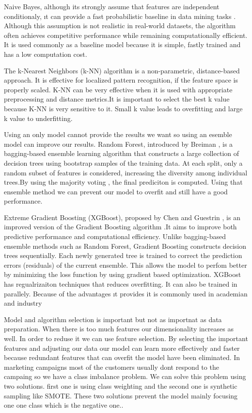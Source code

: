 \documentclass[conference]{IEEEtran}
\begin{document}
Naive Bayes, although its strongly assume that features are independent conditionaly, ıt can provide a fast probabilistic baseline in data mining tasks \cite{domingos1997}.
Although this assumption is not realistic in real-world datasets, the algorithm often achieves competitive performance while remaining computationally efficient.
It is used commonly as a baseline model because it is simple, fastly trained and has a low computation cost.

The k-Nearest Neighbors (k-NN) algorithm \cite{cover1967} is a non-parametric, distance-based approach.
It is effective for localized pattern recognition, if the feature space is properly scaled.
K-NN can be very effective when it is used with appropriate preprocessing and distance metrics.It is important to select the best k value because K-NN is very sensitive to it. Small k value leads to overfitting and large k value to underfitting.

Using an only model cannot provide the results we want so using an esemble model can improve our results.
Random Forest, introduced by Breiman \cite{breiman2001}, is a bagging-based ensemble learning algorithm that constructs a large collection of decision trees using bootstrap samples of the training data. At each split, only a random subset of features is considered, increasing the diversity among individual trees.By using the majority voting , the final prediciton is computed.
Using that ensemble method we can prevent our model to overfit and still have a good performance.

Extreme Gradient Boosting (XGBoost), proposed by Chen and Guestrin \cite{chen2016}, is an improved version of the Gradient Boosting algorithm .It aims to improve both predictive performance and computational efficiency.
Unlike bagging-based ensemble methods such as Random Forest, Gradient Boosting constructs decision trees sequentially.
Each newly generated tree is trained to correct the prediction errors (residuals) of the current ensemble.
This allows the model to perfom better by minimizing the loss function by using  gradient based optimization.
XGBoost has regualrizaiton techniques that reduces overfitting. It can also be trained in parallely. Because of the advantages ıt provides it is commonly used in academian and industry

Model and algorithm selection is important but not as importnat as data preparation. When there is too much features our dimensionality increases as well. In order to reduse it we  can use feature selection.
By selecting the important features and adjusting our data our model can learn more effectively and faster because redundant features that can overfit the model have been eliminated.
In marketing campaigns most of the customers usually dont respond to the campaing so we have a class imbalance problem.
We can solve this problem using two solutions. first one is using class weighting and the second one is synthetic sampling like SMOTE. These two solutions prevent the model mainly focusing one one class which is the negative one.\cite{class_imbalance_study}.
\end{document}
